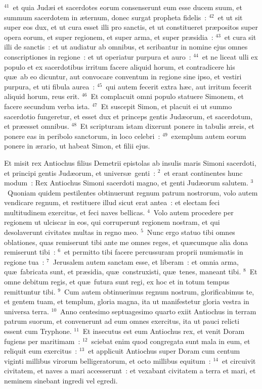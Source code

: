 ${}^{41}$~et quia Jud\ae i et sacerdotes eorum consenserunt eum esse ducem suum, et summum sacerdotem in \ae ternum, donec surgat propheta fidelis~:
${}^{42}$~et ut sit super eos dux, et ut cura esset illi pro sanctis, et ut constitueret pr\ae positos super opera eorum, et super regionem, et super arma, et super pr\ae sidia~:
${}^{43}$~et cura sit illi de sanctis~: et ut audiatur ab omnibus, et scribantur in nomine ejus omnes conscriptiones in regione~: et ut operiatur purpura et auro~:
${}^{44}$~et ne liceat ulli ex populo et ex sacerdotibus irritum facere aliquid horum, et contradicere his qu\ae\ ab eo dicuntur, aut convocare conventum in regione sine ipso, et vestiri purpura, et uti fibula aurea~:
${}^{45}$~qui autem fecerit extra h\ae c, aut irritum fecerit aliquid horum, reus erit.
${}^{46}$~Et complacuit omni populo statuere Simonem, et facere secundum verba ista.
${}^{47}$~Et suscepit Simon, et placuit ei ut summo sacerdotio fungeretur, et esset dux et princeps gentis Jud\ae orum, et sacerdotum, et pr\ae esset omnibus.
${}^{48}$~Et scripturam istam dixerunt ponere in tabulis \ae reis, et ponere eas in peribolo sanctorum, in loco celebri~:
${}^{49}$~exemplum autem eorum ponere in \ae rario, ut habeat Simon, et filii ejus.

\lettrine[lines=3,image=true,loversize=0.05,lraise=-0.03]{E}{}t misit rex Antiochus filius Demetrii epistolas ab insulis maris Simoni sacerdoti, et principi gentis Jud\ae orum, et univers\ae\ genti~:
${}^{2}$~et erant continentes hunc modum~: Rex Antiochus Simoni sacerdoti magno, et genti Jud\ae orum salutem.
${}^{3}$~Quoniam quidem pestilentes obtinuerunt regnum patrum nostrorum, volo autem vendicare regnum, et restituere illud sicut erat antea~: et electam feci multitudinem exercitus, et feci naves bellicas.
${}^{4}$~Volo autem procedere per regionem ut ulciscar in eos, qui corruperunt regionem nostram, et qui desolaverunt civitates multas in regno meo.
${}^{5}$~Nunc ergo statuo tibi omnes oblationes, quas remiserunt tibi ante me omnes reges, et qu\ae cumque alia dona remiserunt tibi~:
${}^{6}$~et permitto tibi facere percussuram proprii numismatis in regione tua~:
${}^{7}$~Jerusalem autem sanctam esse, et liberam~: et omnia arma, qu\ae\ fabricata sunt, et pr\ae sidia, qu\ae\ construxisti, qu\ae\ tenes, maneant tibi.
${}^{8}$~Et omne debitum regis, et qu\ae\ futura sunt regi, ex hoc et in totum tempus remittuntur tibi.
${}^{9}$~Cum autem obtinuerimus regnum nostrum, glorificabimus te, et gentem tuam, et templum, gloria magna, ita ut manifestetur gloria vestra in universa terra.
${}^{10}$~Anno centesimo septuagesimo quarto exiit Antiochus in terram patrum suorum, et convenerunt ad eum omnes exercitus, ita ut pauci relicti essent cum Tryphone.
${}^{11}$~Et insecutus est eum Antiochus rex, et venit Doram fugiens per maritimam~:
${}^{12}$~sciebat enim quod congregata sunt mala in eum, et reliquit eum exercitus~:
${}^{13}$~et applicuit Antiochus super Doram cum centum viginti millibus virorum belligeratorum, et octo millibus equitum~:
${}^{14}$~et circuivit civitatem, et naves a mari accesserunt~: et vexabant civitatem a terra et mari, et neminem sinebant ingredi vel egredi.


